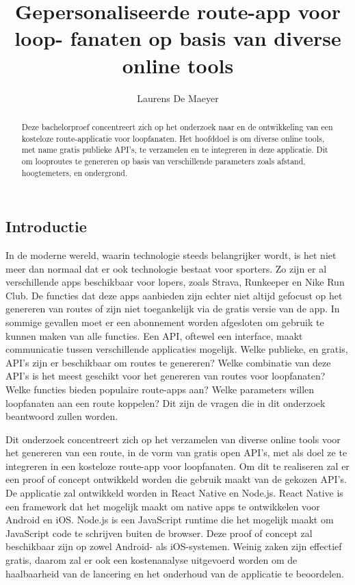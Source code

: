 \documentclass[a0,portrait]{hogent-poster}
\title{Gepersonaliseerde route-app voor loop-
fanaten op basis van diverse online tools}
\author{Laurens De Maeyer}
\begin{document}
\maketitle

\begin{abstract}

Deze bachelorproef concentreert zich op het onderzoek naar en de ontwikkeling van een kosteloze route-applicatie voor loopfanaten. 
Het hoofddoel is om diverse online tools, met name gratis publieke API's, te verzamelen en te integreren in deze applicatie. 
Dit om looproutes te genereren op basis van verschillende parameters zoals afstand, hoogtemeters, en ondergrond.
\end{abstract}

\begin{multicols}{2} %

\section{Introductie}
In de moderne wereld,
waarin tech\-no\-lo\-gie \@ steeds belangrijker wordt,
is het niet meer dan normaal dat er ook technologie bestaat voor sporters.
Zo zijn er al verschillende apps beschikbaar voor lopers, zoals Strava, Runkeeper en Nike Run Club.
De functies dat deze apps aanbieden zijn echter niet altijd gefocust op het genereren van routes of zijn niet toegankelijk via de gratis versie van de app.
In sommige gevallen moet er een abonnement worden afgesloten om gebruik te kunnen maken van alle functies. Een API, oftewel een interface, maakt communicatie tussen verschillende applicaties mogelijk.
Welke publieke, en gratis, API's zijn er beschikbaar om routes te genereren? Welke combinatie van deze API's is het meest geschikt voor het genereren van routes voor loopfanaten? Welke functies bieden populaire route-apps aan? Welke parameters willen loopfanaten aan een route koppelen? Dit zijn de vragen die in dit onderzoek beantwoord zullen worden.

Dit onderzoek concentreert zich op het verzamelen van diverse online tools voor het genereren van een route, in de vorm van gratis open API's, 
met als doel ze te integreren in een kosteloze route-app voor loopfanaten.
Om dit te realiseren zal er een proof of concept ontwikkeld worden die gebruik maakt van de gekozen API's. 
De applicatie zal ontwikkeld worden in React Native en Node.js. React Native is een framework 
dat het mogelijk maakt om native apps te ontwikkelen voor Android en iOS\@. 
Node.js is een JavaScript runtime die het mogelijk maakt om JavaScript code te schrijven buiten de browser.
Deze proof of concept zal beschikbaar zijn op zowel Android- als iOS-systemen. Weinig zaken zijn effectief gratis, 
daarom zal er ook een kostenanalyse uitgevoerd worden om de haalbaarheid van de lancering en het onderhoud van de applicatie te beoordelen.


\end{multicols}
\end{document}
